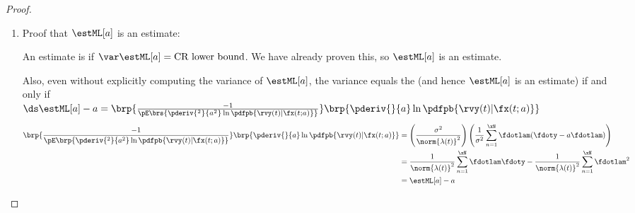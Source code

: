 \begin{proposition}
\begin{proof}
\begin{enumerate}
\item Proof that $\estML[a]$ is an  estimate:

An estimate is  if
$\var\estML[a]=\mbox{CR lower bound}$.
We have already proven this, so $\estML[a]$ is an  estimate.

Also, even without explicitly computing the variance of $\estML[a]$,
the variance equals the 
(and hence $\estML[a]$ is an  estimate)
if and only if
\\\indentx$\ds\estML[a] -  a =
   \brp{\frac{-1}{\pE\brs{
              \pderiv{^2}{ a^2} \ln \pdfpb{\rvy(t)|\fx(t; a)}
           }}}
   \brp{\pderiv{}{ a} \ln \pdfpb{\rvy(t)|\fx(t; a)}}
  $
\begin{align*}
   \brp{\frac{-1}{\pE\brp{\pderiv{^2}{ a^2} \ln \pdfpb{\rvy(t)|\fx(t; a)}}}}
   \brp{\pderiv{}{ a} \ln \pdfpb{\rvy(t)|\fx(t; a)}}
     &= \left(\frac{\sigma^2}{\norm{\lambda(t)}^2}\right)
         \left(
           \frac{1}{\sigma^2} \sum_{n=1}^\xN \fdotlam( \fdoty - a \fdotlam)
         \right)
   \\&= \frac{1}{\norm{\lambda(t)}^2} \sum_{n=1}^\xN \fdotlam \fdoty -
         \frac{1}{\norm{\lambda(t)}^2} \sum_{n=1}^\xN \fdotlam^2
   \\&= \estML[a] - a
\end{align*}
\end{enumerate}
\end{proof}


\end{proposition}
